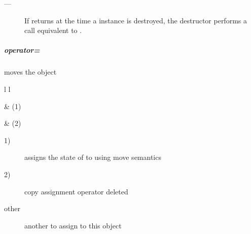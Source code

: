 \remarks
\begin{description}
    \item[---] If  returns  at the time a \fiber
               instance is destroyed, the destructor performs a call
               equivalent to .
\end{description}


\subparagraph*{operator=}
moves the \fiber object

\begin{tabular}{ l l }
    \midrule

     & (1)\\

    \midrule

     & (2)\\

    \midrule
\end{tabular}

\effects
\begin{description}
    \item[1)] assigns the state of  to  using move semantics
    \item[2)] copy assignment operator deleted
\end{description}

\params
\begin{description}
    \item[other]   another \fiber to assign to this object
\end{description}

